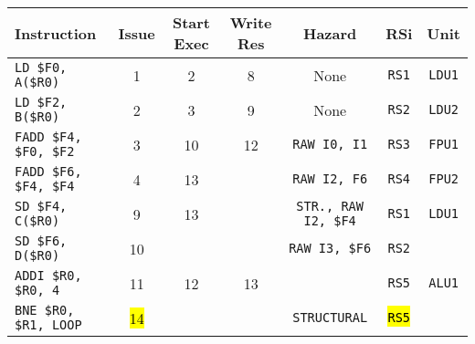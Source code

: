 \begin{enumerate}
    \begin{table}[!htp]
        \centering
        \begin{adjustbox}{width={\textwidth},totalheight={\textheight},keepaspectratio}
        \begin{tabular}{@{} l c c c c c c @{}}
            \toprule
            \textbf{Instruction} & \textbf{Issue} & \textbf{Start Exec} & \textbf{Write Res} & \textbf{Hazard} & \textbf{RSi} & \textbf{Unit} \\
            \midrule
            \texttt{LD \$F0, A(\$R0)}       & 1 & 2 & 8 & None  & \texttt{RS1}   & \texttt{LDU1}  \\ [.5em]
            \texttt{LD \$F2, B(\$R0)}       & 2 & 3 & 9 & None  & \texttt{RS2}   & \texttt{LDU2}  \\ [.5em]
            \texttt{FADD \$F4, \$F0, \$F2}  & 3 & 10 & 12 & \texttt{RAW I0, I1} & \texttt{RS3} & \texttt{FPU1} \\ [.5em]
            \texttt{FADD \$F6, \$F4, \$F4}  & 4 & 13 &   & \texttt{RAW I2, F6} & \texttt{RS4} & \texttt{FPU2} \\ [.5em]
            \texttt{SD \$F4, C(\$R0)}       & 9 & 13 &   & \texttt{STR., RAW I2, \$F4} & \texttt{RS1} & \texttt{LDU1} \\ [.5em]
            \texttt{SD \$F6, D(\$R0)}       & 10 &   &   & \texttt{RAW I3, \$F6} & \texttt{RS2} &       \\ [.5em]
            \texttt{ADDI \$R0, \$R0, 4}     & 11 & 12 & 13 &       & \texttt{RS5} & \texttt{ALU1} \\ [.5em]
            \texttt{BNE \$R0, \$R1, LOOP}   & \hl{14} &   &   & \texttt{STRUCTURAL} & \hl{\texttt{RS5}} &       \\
            \bottomrule
        \end{tabular}
        \end{adjustbox}
    \end{table}
    

\end{enumerate}
